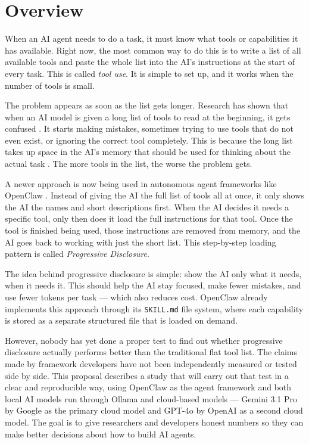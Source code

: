 \section{Overview}
\label{sec:overview}

When an AI agent needs to do a task, it must know what tools or capabilities it has available. Right now, the most common way to do this is to write a list of all available tools and paste the whole list into the AI's instructions at the start of every task. This is called \textit{tool use}. It is simple to set up, and it works when the number of tools is small.

The problem appears as soon as the list gets longer. Research has shown that when an AI model is given a long list of tools to read at the beginning, it gets confused \cite{patil2023gorilla}. It starts making mistakes, sometimes trying to use tools that do not even exist, or ignoring the correct tool completely. This is because the long list takes up space in the AI's memory that should be used for thinking about the actual task \cite{shi2024context}. The more tools in the list, the worse the problem gets.

A newer approach is now being used in autonomous agent frameworks like OpenClaw \cite{openclaw_2025}. Instead of giving the AI the full list of tools all at once, it only shows the AI the names and short descriptions first. When the AI decides it needs a specific tool, only then does it load the full instructions for that tool. Once the tool is finished being used, those instructions are removed from memory, and the AI goes back to working with just the short list. This step-by-step loading pattern is called \textit{Progressive Disclosure}.

The idea behind progressive disclosure is simple: show the AI only what it needs, when it needs it. This should help the AI stay focused, make fewer mistakes, and use fewer tokens per task --- which also reduces cost. OpenClaw \cite{openclaw_2025} already implements this approach through its \texttt{SKILL.md} file system, where each capability is stored as a separate structured file that is loaded on demand.

However, nobody has yet done a proper test to find out whether progressive disclosure actually performs better than the traditional flat tool list. The claims made by framework developers have not been independently measured or tested side by side. This proposal describes a study that will carry out that test in a clear and reproducible way, using OpenClaw as the agent framework and both local AI models run through Ollama \cite{ollama_2024} and cloud-based models --- Gemini 3.1 Pro by Google \cite{google_gemini_2025} as the primary cloud model and GPT-4o by OpenAI \cite{openai_gpt4o_2024} as a second cloud model. The goal is to give researchers and developers honest numbers so they can make better decisions about how to build AI agents.

\newpage
